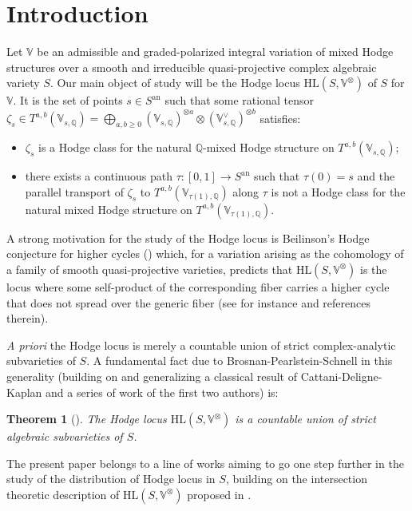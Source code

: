\documentclass[10pt]{article}
\numberwithin{equation}{subsection}
\theoremstyle{plain}
\newtheorem{theorem}{Theorem}[section]
\theoremstyle{definition}
\theoremstyle{remark}
\newcommand{\Q}{\mathbb Q}
\newcommand{\V}{\mathbb V}
\newcommand{\HL}{\mathrm{HL}(S, \V^\otimes)}
\newcommand{\an}{\mathrm{an}}
\begin{document}
\section{Introduction}
Let $\V$ be an admissible and graded-polarized integral variation of mixed Hodge structures over a smooth and irreducible quasi-projective complex algebraic variety $S$. Our main object of study will be the Hodge locus $\HL$ of $S$ for $\V$. It is the set of points $s \in S^\an$ such that some rational tensor $\zeta_s \in T^{a,b}(\V_{s,\Q}) = \bigoplus_{a,b \geqslant 0} (\V_{s,\Q})^{\otimes a} \otimes (\V_{s,\Q}^\vee)^{\otimes b}$ satisfies:
\begin{itemize}
\item $\zeta_s$ is a Hodge class for the natural $\Q$-mixed Hodge structure on $T^{a,b}(\V_{s,\Q})$;
\item there exists a continuous path $\tau : [0,1] \rightarrow S^\an$ such that $\tau(0) = s$ and the parallel transport of $\zeta_s$ to $T^{a,b}(\V_{\tau(1),\Q})$ along $\tau$ is not a Hodge class for the natural mixed Hodge structure on $T^{a,b}(\V_{\tau(1),\Q})$.
\end{itemize}
A strong motivation for the study of the Hodge locus is Beilinson's Hodge conjecture for higher cycles (\cite{beil}) which, for a variation arising as the cohomology of a family of smooth quasi-projective varieties, predicts that $\HL$ is the locus where some self-product of the corresponding fiber carries a higher cycle that does not spread over the generic fiber (see for instance \cite{as2, as1} and references therein).

\textit{A priori} the Hodge locus is merely a countable union of strict complex-analytic subvarieties of $S$. A fundamental fact due to Brosnan-Pearlstein-Schnell in this generality (building on and generalizing a classical result of Cattani-Deligne-Kaplan \cite{cdk} and a series of work \cite{bpan,bpduk,bpcomp} of the first two authors) is:
\begin{theorem}[\cite{bps}]
The Hodge locus $\HL$ is a countable union of strict algebraic subvarieties of $S$.
\end{theorem}
The present paper belongs to a line of works aiming to go one step further in the study of the distribution of Hodge locus in $S$, building on the intersection theoretic description of $\HL$ proposed in \cite{klingler_atyp}.
\end{document}

